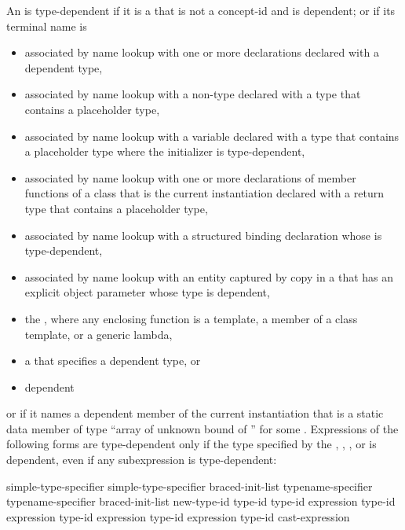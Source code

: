 \pnum
An  is type-dependent
if it is a  that is not a concept-id and is dependent;
or if its terminal name is
\begin{itemize}
\item
associated by name lookup with one or more declarations
declared with a dependent type,
\item
associated by name lookup with
a non-type 
declared with a type
that contains a placeholder type,
\item
associated by name lookup with
a variable declared with a type that contains a placeholder type
where the initializer is type-dependent,
\item
associated by name lookup with one or more
declarations of member functions of a class that is the current instantiation
declared with a return type that contains a placeholder type,
\item
associated by name lookup with
a structured binding declaration whose
 is type-dependent,
\item
associated by name lookup with
an entity captured by copy
in a 
that has an explicit object parameter whose type is dependent,
\item
the
, where any enclosing function is a
template, a member of a class template, or a generic lambda,
\item
a  that specifies a dependent type, or
\item
dependent
\end{itemize}
or if it names a dependent member of the current instantiation that is a static
data member of type
``array of unknown bound of '' for some .
Expressions of the following forms are type-dependent only if the type
specified by the
,
,
,
or
is dependent, even if any subexpression is type-dependent:

\begin{ncsimplebnf}
simple-type-specifier \terminal{(}  \terminal{)}\br
simple-type-specifier braced-init-list\br
typename-specifier \terminal{(}  \terminal{)}\br
typename-specifier braced-init-list\br
\opt{\terminal{::}}   new-type-id \br
\opt{\terminal{::}}   \terminal{(} type-id \terminal{)} \br
{} \terminal{<} type-id \terminal{>} \terminal{(} expression \terminal{)}\br
{} \terminal{<} type-id \terminal{>} \terminal{(} expression \terminal{)}\br
{} \terminal{<} type-id \terminal{>} \terminal{(} expression \terminal{)}\br
{} \terminal{<} type-id \terminal{>} \terminal{(} expression \terminal{)}\br
\terminal{(} type-id \terminal{)} cast-expression
\end{ncsimplebnf}

